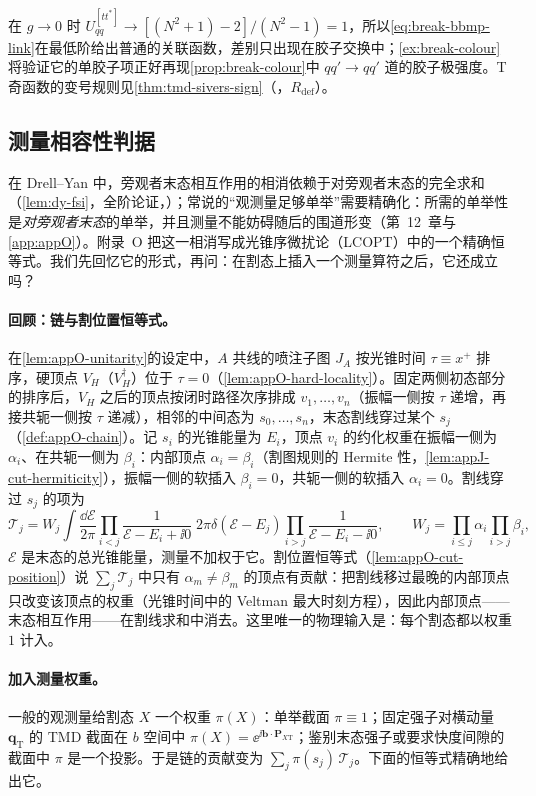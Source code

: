 在 $g\to0$ 时 $U^{[tt^*]}_{qq}\to[(N^2+1)-2]/(N^2-1)=1$，所以\cref{eq:break-bbmp-link}在最低阶给出普通的关联函数，差别只出现在胶子交换中；\cref{ex:break-colour}将验证它的单胶子项正好再现\cref{prop:break-colour}中 $qq'\to qq'$ 道的胶子极强度。T 奇函数的变号规则见\cref{thm:tmd-sivers-sign}（\tagR，$R_{\mathrm{def}}$）。

\subsection{测量相容性判据}

在 Drell--Yan 中，旁观者末态相互作用的相消依赖于对旁观者末态的完全求和（\cref{lem:dy-fsi}，全阶论证，\tagA）；常说的“观测量足够单举”需要精确化：所需的单举性是\emph{对旁观者末态}的单举，并且测量不能妨碍随后的围道形变（第~12~章与\cref{app:appO}）。附录~O 把这一相消写成光锥序微扰论（LCOPT）中的一个精确恒等式。我们先回忆它的形式，再问：在割态上插入一个测量算符之后，它还成立吗？

\paragraph{回顾：链与割位置恒等式。}在\cref{lem:appO-unitarity}的设定中，$A$ 共线的喷注子图 $J_A$ 按光锥时间 $\tau\equiv x^+$ 排序，硬顶点 $V_H$（$V_H^\dagger$）位于 $\tau=0$（\cref{lem:appO-hard-locality}）。固定两侧初态部分的排序后，$V_H$ 之后的顶点按闭时路径次序排成 $v_1,\dots,v_n$（振幅一侧按 $\tau$ 递增，再接共轭一侧按 $\tau$ 递减），相邻的中间态为 $s_0,\dots,s_n$，末态割线穿过某个 $s_j$（\cref{def:appO-chain}）。记 $s_i$ 的光锥能量为 $E_i$，顶点 $v_i$ 的约化权重在振幅一侧为 $\alpha_i$、在共轭一侧为 $\beta_i$：内部顶点 $\alpha_i=\beta_i$（割图规则的 Hermite 性，\cref{lem:appJ-cut-hermiticity}），振幅一侧的软插入 $\beta_i=0$，共轭一侧的软插入 $\alpha_i=0$。割线穿过 $s_j$ 的项为
\begin{equation}\label{eq:break-Tj}
\mathcal T_j=W_j\int\frac{\dd\mathcal E}{2\pi}\prod_{i<j}\frac{1}{\mathcal E-E_i+\ii0}\;2\pi\delta(\mathcal E-E_j)\prod_{i>j}\frac{1}{\mathcal E-E_i-\ii0},\qquad W_j=\prod_{i\le j}\alpha_i\prod_{i>j}\beta_i ,
\end{equation}
$\mathcal E$ 是末态的总光锥能量，测量不加权于它。割位置恒等式（\cref{lem:appO-cut-position}）说 $\sum_j\mathcal T_j$ 中只有 $\alpha_m\neq\beta_m$ 的顶点有贡献：把割线移过最晚的内部顶点只改变该顶点的权重（光锥时间中的 Veltman 最大时刻方程\cite{Veltman1963}），因此内部顶点——末态相互作用——在割线求和中消去。这里唯一的物理输入是：每个割态都以权重 $1$ 计入。

\paragraph{加入测量权重。}一般的观测量给割态 $X$ 一个权重 $\pi(X)$：单举截面 $\pi\equiv1$；固定强子对横动量 $\boldsymbol q_{\mathrm T}$ 的 TMD 截面在 $b$ 空间中 $\pi(X)=\ee^{\ii\boldsymbol b\cdot\boldsymbol P_{X\mathrm T}}$；鉴别末态强子或要求快度间隙的截面中 $\pi$ 是一个投影。于是链的贡献变为 $\sum_j\pi(s_j)\,\mathcal T_j$。下面的恒等式精确地给出它。

